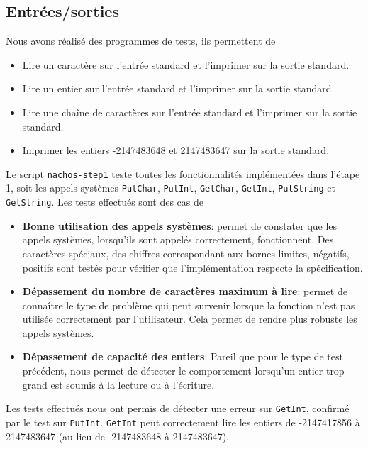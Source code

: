 \documentclass{report}
\begin{document}
\subsection*{Entrées/sorties}
\noindent
Nous avons réalisé des programmes de tests, ils permettent de
\begin{itemize}
 \item Lire un caractère sur l'entrée standard et l'imprimer sur la sortie standard.
 \item Lire un entier sur l'entrée standard et l'imprimer sur la sortie standard.
 \item Lire une chaîne de caractères sur l'entrée standard et l'imprimer sur la sortie
 standard.
 \item Imprimer les entiers -2147483648 et 2147483647 sur la sortie standard.
\end{itemize}
Le script \texttt{nachos-step1} teste toutes les fonctionnalités implémentées dans l'étape 1, soit les appels systèmes \texttt{PutChar}, \texttt{PutInt}, \texttt{GetChar}, \texttt{GetInt}, \texttt{PutString} et \texttt{GetString}.
Les tests effectués sont des cas de
\begin{itemize}
 \item \textbf{Bonne utilisation des appels systèmes}: permet de constater que les appels systèmes, lorsqu'ils sont appelés correctement, fonctionnent. Des caractères spéciaux, des chiffres correspondant aux bornes limites, négatifs, positifs sont testés pour vérifier que l'implémentation respecte la spécification.
 \item \textbf{Dépassement du nombre de caractères maximum à lire}: permet de connaître le type de problème qui peut survenir lorsque la fonction n'est pas utilisée correctement par l'utilisateur. Cela permet de rendre plus robuste les appels systèmes.
 \item \textbf{Dépassement de capacité des entiers}: Pareil que pour le type de test précédent, nous permet de détecter le comportement lorsqu'un entier trop grand est soumis à la lecture ou à l'écriture.
\end{itemize}
Les tests effectués nous ont permis de détecter une erreur sur \texttt{GetInt}, confirmé par le test sur \texttt{PutInt}. \texttt{GetInt} peut correctement lire les entiers de -2147417856 à 2147483647 (au lieu de -2147483648 à 2147483647).
\end{document}
